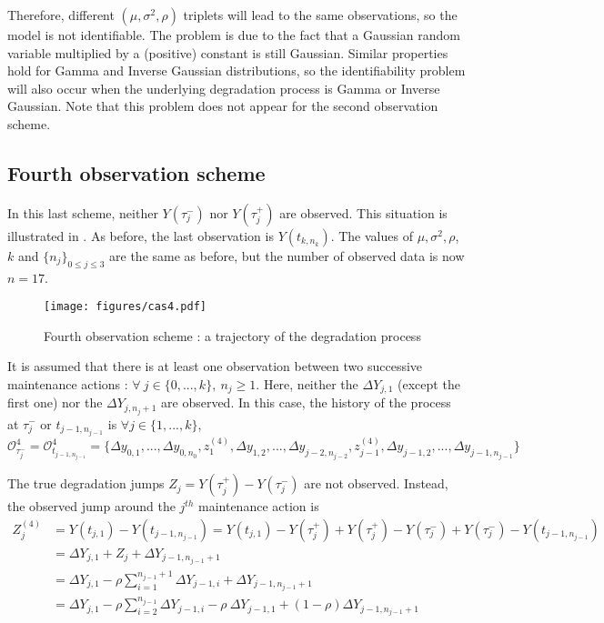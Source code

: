 \noindent Therefore, different $(\mu, \sigma^2, \rho)$ triplets will lead to the same observations, so the model is not identifiable. The problem is due to the fact that a Gaussian random variable multiplied by a (positive) constant is still Gaussian. Similar properties hold for Gamma and Inverse Gaussian distributions, so the identifiability problem will also occur when the underlying degradation process is Gamma or Inverse Gaussian. Note that this problem does not appear for the second observation scheme.



\subsection{Fourth observation scheme}
\label{4case}

In this last scheme, neither $Y(\tau_j^-)$ nor $Y(\tau_j^+)$ are observed. This situation is illustrated in . As before, the last observation is $Y(t_{k,n_k})$.
The values of $\mu, \sigma^2,\rho$, $k$ and $\{n_j\}_{0 \leq j \leq 3}$ are the same as before, but the number of observed data is now $n=17$.


\begin{figure}[h!]
\texttt{[image: figures/cas4.pdf]} 
\centering
\caption{Fourth observation scheme : a trajectory of the degradation process}
\label{fig:cas4}
\end{figure}


It is assumed that there is at least one observation between two successive maintenance actions : $\forall\ j \in \{0,...,k\},\ n_j \geq 1$.
Here, neither the $\Delta Y_{j,1}$ (except the first one) nor the $\Delta Y_{j,n_j+1}$ are  observed. In this case, the history of the process at $\tau_j^-$ or $t_{j-1,n_{j-1}}$ is
$\forall j \in \{1,...,k\}$,\\
$\mathcal{O}_{\tau_j^-}^4=\mathcal{O}_{t_{j-1,n_{j-1}}}^4=\{\Delta y_{0,1},...,\Delta y_{0,n_0},z_{1}^{(4)},\Delta y_{1,2},...,\Delta y_{j-2,n_{j-2}},z_{j-1}^{(4)},\Delta y_{j-1,2},...,\Delta y_{j-1,n_{j-1}}\}$


\noindent The true degradation jumps $Z_j = Y(\tau_{j}^+) - Y(\tau_{j}^-)$ are not observed.
Instead, the observed jump around the $j^{th}$ maintenance action is 
\begin{align}
Z_j^{(4)}&= Y(t_{j,1})-Y(t_{j-1,n_{j-1}})
=Y(t_{j,1})-Y(\tau_j^+)+Y(\tau_j^+)-Y(\tau_j^-)+Y(\tau_j^-)-Y(t_{j-1,n_{j-1}}) \nonumber\\
&=\Delta Y_{j,1}+Z_j +\Delta Y_{j-1,n_{j-1}+1} \nonumber\\
&=\Delta Y_{j,1}-\rho \sum\limits_{i=1}^{n_{j-1}+1} \Delta Y_{j-1,i}+\Delta Y_{j-1,n_{j-1}+1}\nonumber\\
&=\Delta Y_{j,1}-\rho \sum\limits_{i=2}^{n_{j-1}} \Delta Y_{j-1,i}-\rho\ \Delta Y_{j-1,1}+(1-\rho)\Delta Y_{j-1,n_{j-1}+1}
\label{eq:zj4}
\end{align}

